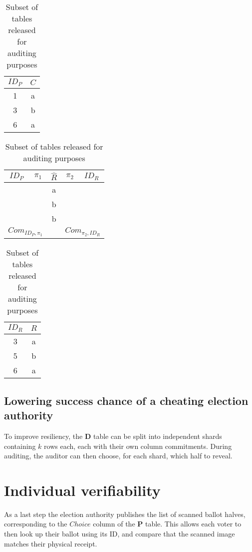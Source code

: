 \begin{table}
	\centering
	\begin{subtable}{.2\linewidth}
	\end{subtable}%
		\centering
		\begin{tabular}{|c|c|}
			\hline
			$ID_P$ & $C$ \\
			\hline
			1 & a \\
			3 & b \\
			6 & a \\
			\hline
		\end{tabular}
	\begin{subtable}{.6\linewidth}
		\centering
		\begin{tabular}{|c|c|c|c|c|}
			\hline
			$ID_P$ & $\pi_1$ & $\hat{R}$ & $\pi_2$ & $ID_R$ \\
			\hline
			  &                     & a &                     &   \\
			  &                     & b &                     &   \\
			  &                     & b &                     &   \\
			\hline
			\multicolumn{2}{|c|}{$Com_{ID_P, \pi_1}$} &   & \multicolumn{2}{c|}{$Com_{\pi_2, ID_R}$} \\
			\hline
		\end{tabular}
	\end{subtable}
	\begin{subtable}{.2\linewidth}
		\centering
		\begin{tabular}{|c|c|}
			\hline
			$ID_R$ & $R$ \\
			\hline
			3 & a \\
			5 & b \\
			6 & a \\
			\hline
		\end{tabular}
	\end{subtable}
	\caption{Subset of tables released for auditing purposes}
	\label{tbl:decryption_audit}
\end{table}

\subsection{Lowering success chance of a cheating election authority}

To improve resiliency, the \textbf{D} table can be split into independent shards
containing $k$ rows each, each with their own column commitments. During
auditing, the auditor can then choose, for each shard, which half to reveal.

\section{Individual verifiability}

As a last step the election authority publishes the list of scanned ballot
halves, corresponding to the $Choice$ column of the \textbf{P} table. This allows
each voter to then look up their ballot using its ID, and compare that the
scanned image matches their physical receipt.
